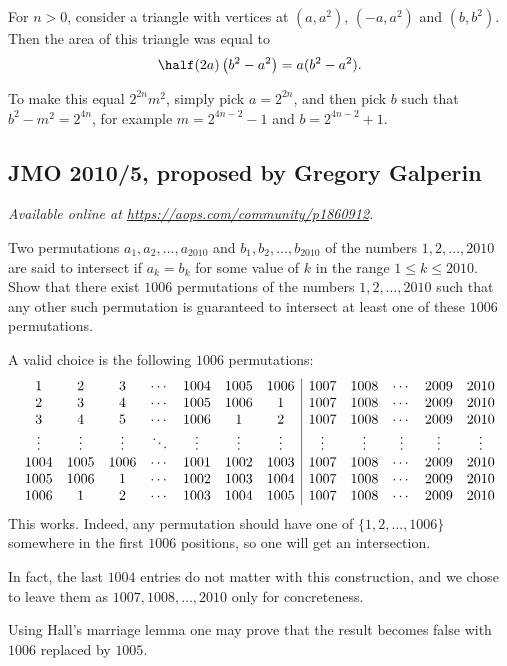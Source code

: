 \documentclass[11pt]{scrartcl}
\begin{document}
For $n > 0$, consider a triangle
with vertices at $(a,a^2)$, $(-a,a^2)$ and $(b, b^2)$.
Then the area of this triangle was equal to
\[ \half (2a) \left( b^2-a^2 \right) = a(b^2-a^2). \]

To make this equal $2^{2n} m^2$,
simply pick $a = 2^{2n}$,
and then pick $b$ such that $b^2-m^2 = 2^{4n}$,
for example $m = 2^{4n-2}-1$ and $b=2^{4n-2}+1$.
\pagebreak

\subsection{JMO 2010/5, proposed by Gregory Galperin}
\textsl{Available online at \url{https://aops.com/community/p1860912}.}
\begin{mdframed}[style=mdpurplebox,frametitle={Problem statement}]
Two permutations $a_1,a_2,\dots,a_{2010}$
and $b_1,b_2,\dots,b_{2010}$ of the numbers $1,2,\dots,2010$
are said to intersect if $a_k=b_k$ for some value of $k$ in the range $1\le k\le 2010$.
Show that there exist $1006$ permutations of the numbers $1,2,\dots,2010$
such that any other such permutation is guaranteed to
intersect at least one of these $1006$ permutations.
\end{mdframed}
A valid choice is the following $1006$ permutations:
\[
\begin{array}{cccc ccc | ccccc}
1 & 2 & 3 & \dotsb & 1004 & 1005 & 1006 & 1007 & 1008 & \dotsb & 2009 & 2010 \\
2 & 3 & 4 & \dotsb & 1005 & 1006 & 1 & 1007 & 1008 & \dotsb & 2009 & 2010 \\
3 & 4 & 5 & \dotsb & 1006 & 1 & 2 & 1007 & 1008 & \dotsb & 2009 & 2010 \\
\vdots & \vdots & \vdots & \ddots & \vdots & \vdots & \vdots &
\vdots& \vdots & \vdots & \vdots & \vdots \\
1004 & 1005 & 1006 & \dotsb & 1001 & 1002 & 1003 & 1007 & 1008 & \dotsb & 2009 & 2010 \\
1005 & 1006 & 1 & \dotsb & 1002 & 1003 & 1004 & 1007 & 1008 & \dotsb & 2009 & 2010 \\
1006 & 1 & 2 & \dotsb & 1003 & 1004 & 1005 & 1007 & 1008 & \dotsb & 2009 & 2010 \\
\end{array}
\]
This works. Indeed, any permutation should have one of $\{1, 2, \dots, 1006\}$
somewhere in the first $1006$ positions,
so one will get an intersection.

\begin{remark*}
  In fact, the last $1004$ entries do not matter with this
  construction, and we chose to leave them as $1007, 1008, \dots, 2010$
  only for concreteness.
\end{remark*}
\begin{remark*}
  Using Hall's marriage lemma one may prove that
  the result becomes false with $1006$ replaced by $1005$.
\end{remark*}
\pagebreak
\end{document}
